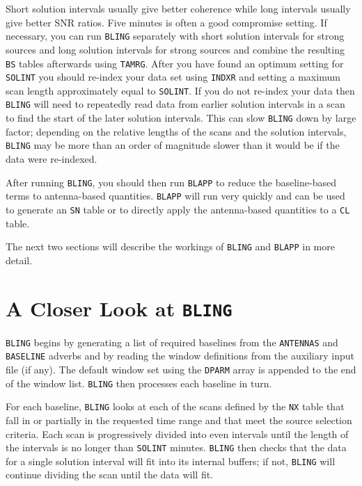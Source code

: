 Short solution intervals usually give better coherence while long
intervals usually give better SNR ratios.  Five minutes is
often a good compromise setting.  If necessary, you can run {\tt BLING}
separately with short solution intervals for strong sources and long
solution intervals for strong sources and combine the resulting {\tt
BS} tables afterwards using {\tt TAMRG}.  After you have found an
optimum setting for {\tt SOLINT} you should re-index your data set
using {\tt INDXR} and setting a maximum scan length approximately
equal to {\tt SOLINT}.  If you do not re-index your data then {\tt
BLING} will need to repeatedly read data from earlier solution
intervals in a scan to find the start of the later solution intervals.
This can slow {\tt BLING} down by large factor; depending on the
relative lengths of the scans and the solution intervals, {\tt BLING}
may be more than an order of magnitude slower than it would be if the
data were re-indexed.

After running {\tt BLING}, you should then run {\tt BLAPP} to reduce
the baseline-based terms to antenna-based quantities.  {\tt BLAPP}
will run very quickly and can be used to generate an {\tt SN} table or
to directly apply the antenna-based quantities to a {\tt CL} table.

The next two sections will describe the workings of {\tt BLING} and
{\tt BLAPP} in more detail.

\section{A Closer Look at {\tt BLING}}

{\tt BLING} begins by generating a list of required baselines from the
{\tt ANTENNAS} and {\tt BASELINE} adverbs and by reading the window
definitions from the auxiliary input file (if any).  The default
window set using the {\tt DPARM} array is appended to the end of the
window list.  {\tt BLING} then processes each baseline in turn.

For each baseline, {\tt BLING} looks at each of the scans defined by
the {\tt NX} table that fall in or partially in the requested
time range and that meet the source selection criteria.  Each scan is
progressively divided into even intervals until the length of the
intervals is no longer than {\tt SOLINT} minutes.  {\tt BLING} then
checks that the data for a single solution interval will fit into its
internal buffers; if not, {\tt BLING} will continue dividing the scan
until the data will fit.

